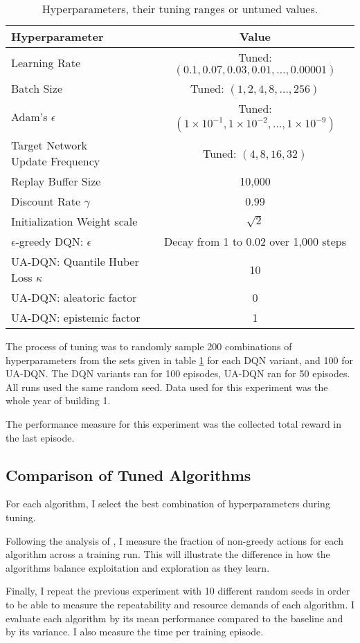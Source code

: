 \begin{table}
    \centering
    \caption{Hyperparameters, their tuning ranges or untuned values.}
    \label{tab:tuning}
    \begin{tabular}{l|c}
        Hyperparameter & Value \\ \hline
        Learning Rate  & Tuned:  $(0.1, 0.07, 0.03, 0.01, \dots, 0.00001)$                               \\
        Batch Size     & Tuned: $(1,2,4,8,\dots ,256)$                             \\
        Adam's $\epsilon$ & Tuned: $(1\times 10^{-1}, 1\times 10^{-2}, \dots, 1\times 10^{-9})$                           \\
        \makecell[l]{Target Network \\ Update Frequency} & Tuned: $(4, 8, 16, 32)$ \\ \hline
        Replay Buffer Size & 10,000 \\
        Discount Rate $\gamma$ & 0.99 \\ %
        Initialization Weight scale & $\sqrt{2}$ \\
        $\epsilon$-greedy DQN: $\epsilon$ & Decay from 1 to 0.02 over 1,000 steps \\
        UA-DQN: Quantile Huber Loss $\kappa$ & 10 \\
        UA-DQN: aleatoric factor & 0 \\
        UA-DQN: epistemic factor & 1 \\
    \end{tabular}
\end{table}

The process of tuning was to randomly sample 200 combinations of hyperparameters from the sets given in table \ref{tab:tuning} for each DQN variant, and 100 for UA-DQN.
The DQN variants ran for 100 episodes, UA-DQN ran for 50 episodes.
All runs used the same random seed.
Data used for this experiment was the whole year of building 1.

The performance measure for this experiment was the collected total reward in the last episode.

\subsection{Comparison of Tuned Algorithms}
For each algorithm, I select the best combination of hyperparameters during tuning.

Following the analysis of \cite{clements2020EstimatingRiskUncertainty}, I measure the fraction of non-greedy actions for each algorithm across a training run.
This will illustrate the difference in how the algorithms balance exploitation and exploration as they learn.

Finally, I repeat the previous experiment with 10 different random seeds in order to be able to measure the repeatability and resource demands of each algorithm.
I evaluate each algorithm by its mean performance compared to the baseline and by its variance.
I also measure the time per training episode.
